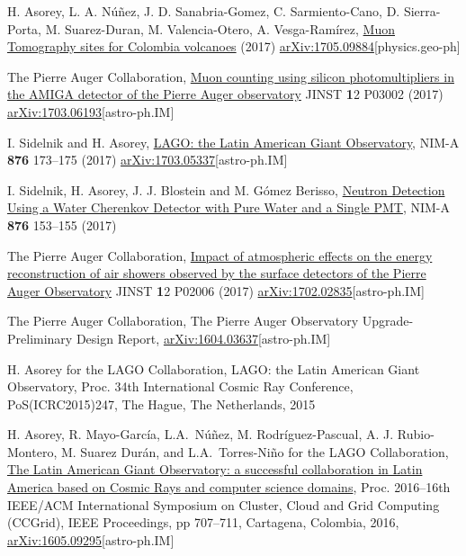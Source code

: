 \begin{etaremune}
\item {}H. Asorey, L. A. Núñez, J. D. Sanabria-Gomez, C. Sarmiento-Cano, D. Sierra-Porta, M. Suarez-Duran, M. Valencia-Otero, A. Vesga-Ramírez, \href{}{{Muon Tomography sites for Colombia volcanoes}} (2017) \href{http://arxiv.org/abs/1705.09884}{arXiv:1705.09884}[physics.geo-ph]

\item {}The Pierre Auger Collaboration, \href{https://doi.org/10.1088/1748-0221/12/03/P03002}{{Muon counting using silicon photomultipliers in the AMIGA detector of the Pierre Auger observatory}} JINST {\textbf 12} P03002 (2017) \href{http://arxiv.org/abs/1703.06193}{arXiv:1703.06193}[astro-ph.IM]

\item {}I. Sidelnik and H. Asorey, \href{https://doi.org/10.1016/j.nima.2017.02.069}{{LAGO: the Latin American Giant Observatory}}, NIM-A {\textbf{876}} 173--175 (2017) \href{http://arxiv.org/abs/1703.05337}{arXiv:1703.05337}[astro-ph.IM]

\item {} I. Sidelnik, H. Asorey, J. J. Blostein and M. Gómez Berisso, \href{https://doi.org/10.1016/j.nima.2017.02.048}{{Neutron Detection Using a Water Cherenkov Detector with Pure Water and a Single PMT}}, NIM-A {\textbf{876}} 153--155 (2017)

\item {}The Pierre Auger Collaboration, \href{https://doi.org/10.1088/1748-0221/12/02/P02006}{{Impact of atmospheric effects on the energy reconstruction of air showers observed by the surface detectors of the Pierre Auger Observatory}} JINST {\textbf 12} P02006 (2017) \href{http://arxiv.org/abs/1702.02835}{arXiv:1702.02835}[astro-ph.IM]

\item {} The Pierre Auger Collaboration, {{The Pierre Auger Observatory Upgrade-Preliminary Design Report}}, \href{http://arxiv.org/abs/1604.03637}{arXiv:1604.03637}[astro-ph.IM]

\item {}H. Asorey for the LAGO Collaboration, {{LAGO: the Latin American Giant Observatory}}, \en Proc.
34th International Cosmic Ray Conference, PoS(ICRC2015)247, The Hague, The Netherlands, 2015

\item {} H. Asorey, R. Mayo-García, L.A.\ Núñez, M. Rodríguez-Pascual, A. J. Rubio-Montero, M. Suarez Durán, and L.A.\ Torres-Niño for the LAGO Collaboration, {{\href{http://dx.doi.org/10.1109/CCGrid.2016.110}{The Latin American Giant Observatory: a successful collaboration in Latin America based on Cosmic Rays and computer science domains}}}, \en Proc.
2016--16th IEEE/ACM International Symposium on Cluster, Cloud and Grid Computing (CCGrid), IEEE Proceedings, pp 707--711, Cartagena, Colombia, 2016, \href{http://arxiv.org/abs/1605.09295}{arXiv:1605.09295}[astro-ph.IM]


\end{etaremune}
